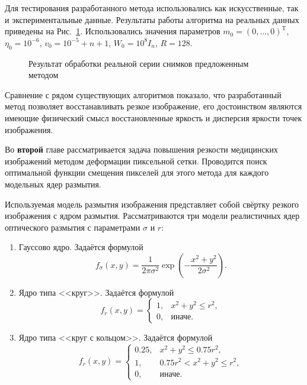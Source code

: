 Для тестирования разработанного метода использовались как искусственные, так и экспериментальные данные. Результаты работы алгоритма на реальных данных приведены на Рис.~\ref{fig:sinopsis-blinking}. Использовались значения параметров $m_0 = \left(0, \ldots,  0\right)^\mathrm{T}$, $\eta_0 = 10^{-6}$, $v_0 = 10^{-5} + n + 1$, $W_0 = 10^8 I_n$, $R=128$.

\begin{figure}[ht]
	\caption{Результат обработки реальной серии снимков предложенным методом}
	\label{fig:sinopsis-blinking}
\end{figure}

Сравнение с рядом существующих алгоритмов показало, что разработанный метод позволяет восстанавливать резкое изображение, его достоинством являются имеющие физический смысл восстановленные яркость и дисперсия яркости точек изображения.


Во {\textbf{второй}} главе рассматривается задача повышения резкости медицинских изображений методом деформации пиксельной сетки. Проводится поиск оптимальной функции смещения пикселей для этого метода для каждого модельных ядер размытия.

Используемая модель размытия изображения представляет собой свёртку резкого изображения с ядром размытия. Рассматриваются три модели реалистичных ядер оптического размытия с параметрами $\sigma$ и $r$:
\begin{enumerate}[beginpenalty=10000]
	\item Гауссово ядро.
	Задаётся формулой
	$$f_\sigma\left(x,y\right) = \frac{1}{2\pi\sigma^2}\exp\left(-\frac{x^2+y^2}{2\sigma^2}\right).$$
	
	\item Ядро типа <<круг>>.
	Задаётся формулой $$f_r\left(x,y\right) = \begin{cases}
		1, & x^2 + y^2 \leq r^2, \\
		0, & \text{иначе}.
	\end{cases}$$
	
	\item Ядро типа <<круг с кольцом>>.
	Задаётся формулой $$f_r(x, y) = \begin{cases}
		0.25, & x^2 + y^2 \leq 0.75 r^2,\\
		1, & 0.75 r^2 < x^2 + y^2 \leq r^2,\\
		0, & \text{иначе}.
	\end{cases}$$
\end{enumerate}

